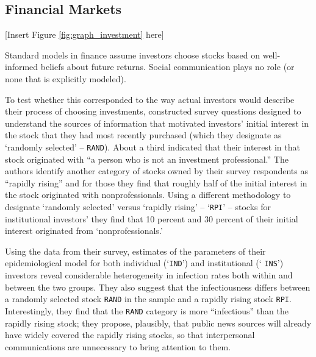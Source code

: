 \subsection{Financial Markets}\label{subsec:assetprice}

\begin{center}
	[Insert Figure \ref{fig:graph_investment}  here]
\end{center}

Standard models in finance assume investors choose stocks based on well-informed beliefs about future returns. Social communication plays no role (or none that is explicitly modeled).

To test whether this corresponded to the way actual investors would describe their process of choosing investments, \cite{shiller1989survey} constructed survey questions designed to understand the sources of information that motivated investors' initial interest in the stock that they had most recently purchased (which they designate as `randomly selected' -- \texttt{RAND}).  About a third indicated that their interest in that stock originated with ``a person who is not an investment professional.''  The authors identify another category of stocks owned by their survey respondents as ``rapidly rising'' and for those they find that roughly half of the initial interest in the stock originated with nonprofessionals.  Using a different methodology to designate `randomly selected' versus `rapidly rising' -- `\texttt{RPI}' -- stocks for institutional investors' they find that 10 percent and 30 percent of their initial interest originated from `nonprofessionals.'

Using the data from their survey, estimates of the parameters of their epidemiological model for both individual (`\texttt{IND}') and institutional (` \texttt{INS}') investors reveal considerable heterogeneity in infection rates both within and between the two groups. They also suggest that the infectiousness differs between a randomly selected stock \texttt{RAND} in the sample and a rapidly rising stock \texttt{RPI}. Interestingly, they find that the \texttt{RAND} category is more ``infectious'' than the rapidly rising stock; they propose, plausibly, that public news sources will already have widely covered the rapidly rising stocks, so that interpersonal communications are unnecessary to bring attention to them.

